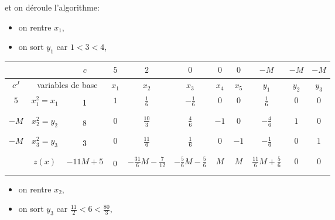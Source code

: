 \begin{td-sol}[]
\begin{enumerate}
        et on déroule l'algorithme:
        \begin{itemize}
            \item on rentre \(x_1\),
            \item on sort \(y_1\) car \(1 < 3 < 4\),
        \end{itemize}
        \becomes{}
        \begin{center}
            \begin{tabular}{|ccc|cccccccc|} %
                \hline  %
                & \ &\(c\)&\(5\)&\(2\)&\(0\)&\(0\)&\(0\)&\(-M\)&\(-M\)&\(-M\)\\
                \hline %
                \multicolumn{1}{|c|}{\(c^J\)}& \multicolumn{2}{c|}{variables de base}&\(x_1\)&\(x_2\)&\(x_3\)&\(x_4\)&\(x_5\)&\(y_1\)&\(y_2\)&\(y_3\)\\
                \hline %
                \multicolumn{1}{|c|}{\(5\)}& \multicolumn{1}{c|}{\(x_1^{2}=x_1\)} &\(\vphantom{\dfrac16}1\)&\(1\)&\(\frac16\)&\(-\frac16\)&\(0\)&\(0\)&\(\frac16\)&\(0\)&\(0\)\\
                \hline %
                \multicolumn{1}{|c|}{\(-M\)}& \multicolumn{1}{c|}{\(x_2^{2}=y_2\)} &\(\vphantom{\dfrac16}8\)&\(0\)&\(\frac{10}{3}\)&\(\frac46\)&\(-1\)&\(0\)&\(-\frac46\)&\(1\)&\(0\)\\
                \hline %
                \multicolumn{1}{|c|}{\(-M\)}& \multicolumn{1}{c|}{\(x_3^{2}=y_3\)} &\(\vphantom{\dfrac16}3\)&\(0\)&\(\frac{11}{6}\)&\(\frac16\)&\(0\)&\(-1\)&\(-\frac16\)&\(0\)&\(1\)\\
                \hline %
                \multicolumn{1}{|c|}{} &\(z(x)\)& \multicolumn{1}{|c|}{\(-11M+5\)} &\(\vphantom{\dfrac16}0\)&\(-\frac{31}6M-\frac7{12}\)&\(-\frac56M-\frac56\)&\(M\)&\(M\)&\(\frac{11}{6}M+\frac56\)&\(0\)&\(0\)\\
                \hline %
            \end{tabular}
        \end{center}
        \begin{itemize}
            \item on rentre \(x_2\),
            \item on sort \(y_3\) car \(\frac{11}{2} < 6 < \frac{80}{3}\),
        \end{itemize}
        \becomes{}
        \begin{center}
            \begin{tabular}{|ccc|cccccccc|} %

\end{tabular}
\end{center}
\end{enumerate}
\end{td-sol}
